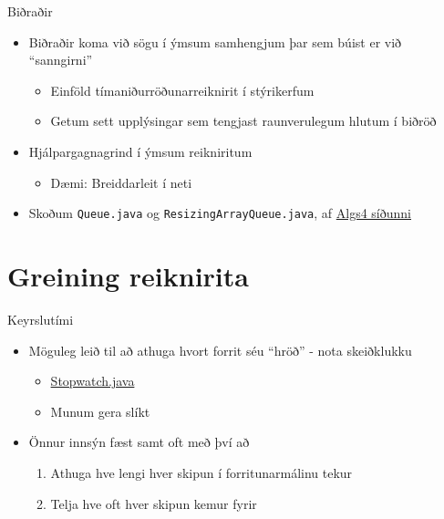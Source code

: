 \documentclass{beamer}
\begin{document}
\begin{frame}{Biðraðir}
	\begin{itemize}
		\item Biðraðir koma við sögu í ýmsum samhengjum þar sem búist er við ``sanngirni''
		      \begin{itemize}
			      \item Einföld tímaniðurröðunarreiknirit í stýrikerfum
			      \item Getum sett upplýsingar sem tengjast raunverulegum hlutum í biðröð
		      \end{itemize}
		\item Hjálpargagnagrind í ýmsum reikniritum
		      \begin{itemize}
			      \item Dæmi: Breiddarleit í neti
		      \end{itemize}
		\item Skoðum \texttt{Queue.java} og \texttt{ResizingArrayQueue.java},  af \href{https://algs4.cs.princeton.edu/code/}{Algs4 síðunni}
	\end{itemize}
\end{frame}

\section{Greining reiknirita}

\begin{frame}{Keyrslutími}
	\begin{itemize}
		\item Möguleg leið til að athuga hvort forrit séu ``hröð'' - nota skeiðklukku
		      \begin{itemize}
				  \item \href{https://algs4.cs.princeton.edu/code/}{Stopwatch.java}
				  \item Munum gera slíkt
		      \end{itemize}
		\item Önnur innsýn fæst samt oft með því að
		      \begin{enumerate}
			      \item Athuga hve lengi hver skipun í forritunarmálinu tekur
			      \item Telja hve oft hver skipun kemur fyrir
		      \end{enumerate}
	\end{itemize}
\end{frame}
\end{document}
